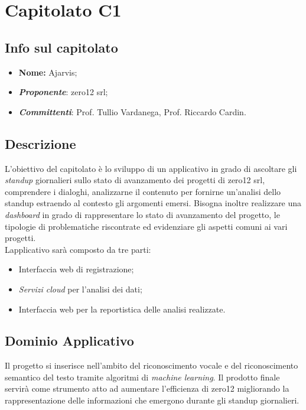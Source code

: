\section{Capitolato C1}
\subsection{Info sul capitolato}
\begin{itemize}
	\item \textbf{Nome:} Ajarvis;
	\item \textbf{\textit{Proponente}}: zero12 srl;
	\item \textbf{\textit{Committenti}}: Prof. Tullio Vardanega, Prof. Riccardo Cardin.
\end{itemize}

\subsection{Descrizione}
L'obiettivo del capitolato è lo sviluppo di un applicativo in grado di ascoltare gli \textit{standup} giornalieri sullo stato di avanzamento dei progetti di zero12 srl, comprendere i dialoghi, analizzarne il contenuto per fornirne un'analisi dello standup estraendo al contesto gli argomenti emersi. Bisogna inoltre realizzare una \textit{dashboard} in grado di rappresentare lo stato di avanzamento del progetto, le tipologie di problematiche riscontrate ed evidenziare gli aspetti comuni ai vari progetti.
\\
Lapplicativo sarà composto da tre parti:
\begin{itemize}
	\item Interfaccia web di registrazione;
	\item \textit{Servizi cloud} per l'analisi dei dati;
	\item Interfaccia web per la reportistica delle analisi realizzate.
\end{itemize}

\subsection{Dominio Applicativo}
Il progetto si inserisce nell'ambito del riconoscimento vocale e del riconoscimento semantico del testo tramite algoritmi di \textit{machine learning}. Il prodotto finale servirà come strumento atto ad aumentare l'efficienza di zero12 migliorando la rappresentazione delle informazioni che emergono durante gli standup giornalieri.

